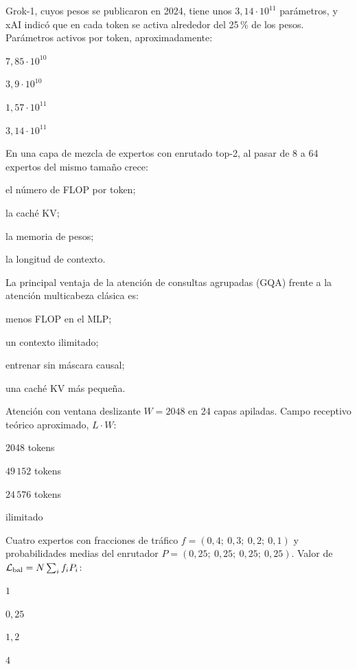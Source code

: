 \begin{cuestiones}
\item {} Grok-1, cuyos pesos se publicaron en 2024, tiene unos $3{,}14\cdot 10^{11}$ parámetros, y xAI indicó que en cada token se activa alrededor del 25\,\% de los pesos. Parámetros activos por token, aproximadamente:
\begin{opciones}
  \item $7{,}85\cdot 10^{10}$
  \item $3{,}9\cdot 10^{10}$
  \item $1{,}57\cdot 10^{11}$
  \item $3{,}14\cdot 10^{11}$
\end{opciones}

\item {} En una capa de mezcla de expertos con enrutado top-2, al pasar de 8 a 64 expertos del mismo tamaño crece:
\begin{opciones}
  \item el número de FLOP por token;
  \item la caché KV;
  \item la memoria de pesos;
  \item la longitud de contexto.
\end{opciones}

\item {} La principal ventaja de la atención de consultas agrupadas (GQA) frente a la atención multicabeza clásica es:
\begin{opciones}
  \item menos FLOP en el MLP;
  \item un contexto ilimitado;
  \item entrenar sin máscara causal;
  \item una caché KV más pequeña.
\end{opciones}

\item {} Atención con ventana deslizante $W=2048$ en 24 capas apiladas. Campo receptivo teórico aproximado, $L\cdot W$:
\begin{opciones}
  \item 2048 tokens
  \item $49\,152$ tokens
  \item $24\,576$ tokens
  \item ilimitado
\end{opciones}

\item {} Cuatro expertos con fracciones de tráfico $f=(0{,}4;\ 0{,}3;\ 0{,}2;\ 0{,}1)$ y probabilidades medias del enrutador $P=(0{,}25;\ 0{,}25;\ 0{,}25;\ 0{,}25)$. Valor de $\mathcal{L}_{\mathrm{bal}}=N\sum_i f_iP_i$:
\begin{opciones}
  \item $1$
  \item $0{,}25$
  \item $1{,}2$
  \item $4$
\end{opciones}


\end{cuestiones}
